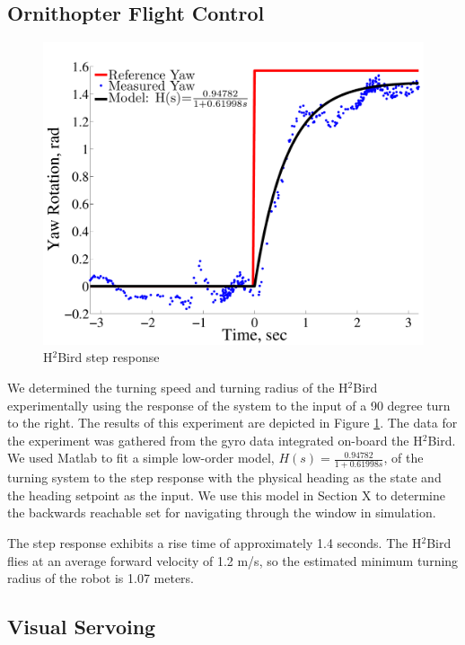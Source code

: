\documentclass{aamas2013}
\begin{document}
\subsection{Ornithopter Flight Control}
\label{sec:flight_control}
\begin{figure}[tb]
\centering
\includegraphics[width=\linewidth]{figures/step_response_total.pdf}
\caption{H$^2$Bird step response}
\label{fig:step_response}
\end{figure}

We determined the turning speed and turning radius of the H$^2$Bird experimentally using the response of the system to the input of a 90 degree turn to the right. The results of this experiment are depicted in Figure \ref{fig:step_response}. The data for the experiment was gathered from the gyro data integrated on-board the H$^2$Bird. We used Matlab to fit a simple low-order model, $H(s) = \frac{0.94782}{1+0.61998s}$, of the turning system to the step response with the physical heading as the state and the heading setpoint as the input. We use this model in Section X to determine the backwards reachable set for navigating through the window in simulation.

The step response exhibits a rise time of approximately 1.4 seconds. The H$^2$Bird flies at an average forward velocity of 1.2 m/s, so the estimated minimum turning radius of the robot is 1.07 meters.


\subsection{Visual Servoing}
\end{document}
